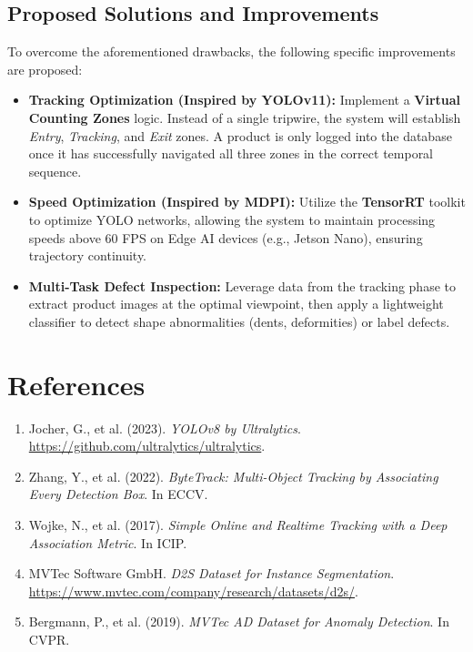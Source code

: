 \documentclass[12pt,a4paper]{report}
\begin{document}
\section{Proposed Solutions and Improvements}
To overcome the aforementioned drawbacks, the following specific improvements are proposed:
\begin{itemize}
    \item \textbf{Tracking Optimization (Inspired by YOLOv11):} Implement a \textbf{Virtual Counting Zones} logic. Instead of a single tripwire, the system will establish \textit{Entry}, \textit{Tracking}, and \textit{Exit} zones. A product is only logged into the database once it has successfully navigated all three zones in the correct temporal sequence.
    \item \textbf{Speed Optimization (Inspired by MDPI):} Utilize the \textbf{TensorRT} toolkit to optimize YOLO networks, allowing the system to maintain processing speeds above 60 FPS on Edge AI devices (e.g., Jetson Nano), ensuring trajectory continuity.
    \item \textbf{Multi-Task Defect Inspection:} Leverage data from the tracking phase to extract product images at the optimal viewpoint, then apply a lightweight classifier to detect shape abnormalities (dents, deformities) or label defects.
\end{itemize}

\chapter*{References}
\begin{enumerate}
    \item Jocher, G., et al. (2023). \textit{YOLOv8 by Ultralytics}. \url{https://github.com/ultralytics/ultralytics}.
    \item Zhang, Y., et al. (2022). \textit{ByteTrack: Multi-Object Tracking by Associating Every Detection Box}. In ECCV.
    \item Wojke, N., et al. (2017). \textit{Simple Online and Realtime Tracking with a Deep Association Metric}. In ICIP.
    \item MVTec Software GmbH. \textit{D2S Dataset for Instance Segmentation}. \url{https://www.mvtec.com/company/research/datasets/d2s/}.
    \item Bergmann, P., et al. (2019). \textit{MVTec AD Dataset for Anomaly Detection}. In CVPR.
\end{enumerate}
\end{document}
